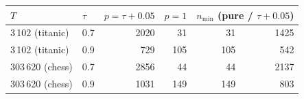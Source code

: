 \begin{tabular}{llrrrr}
\toprule
$T$ & $\tau$ & $p=\tau+0.05$ & $p=1$ & \multicolumn{2}{l}{$n_{\min}$ (pure / $\tau+0.05$)}\\
\midrule
3\,102 (titanic) & 0.7 & 2020 & 31 & 31 & 1425\\
3\,102 (titanic) & 0.9 & 729 & 105 & 105 & 542\\
303\,620 (chess) & 0.7 & 2856 & 44 & 44 & 2137\\
303\,620 (chess) & 0.9 & 1031 & 149 & 149 & 803\\
\bottomrule
\end{tabular}
